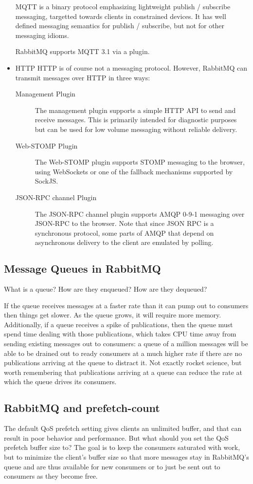 \begin{itemize}
  MQTT is a binary protocol emphasizing lightweight publish / subscribe messaging, targetted towards clients in constrained devices. It has well defined messaging semantics for publish / subscribe, but not for other messaging idioms.


  RabbitMQ supports MQTT 3.1 via a plugin.
  \item HTTP
  HTTP is of course not a messaging protocol. However, RabbitMQ can transmit messages over HTTP in three ways:

  \begin{description}
    \item[Management Plugin] The management plugin supports a simple HTTP API to send and receive messages. This is primarily intended for diagnostic purposes but can be used for low volume messaging without reliable delivery.
    \item [Web-STOMP Plugin] The Web-STOMP plugin supports STOMP messaging to the browser, using WebSockets or one of the fallback mechanisms supported by SockJS.
    \item [JSON-RPC channel Plugin] The JSON-RPC channel plugin supports AMQP 0-9-1 messaging over JSON-RPC to the browser. Note that since JSON RPC is a synchronous protocol, some parts of AMQP that depend on asynchronous delivery to the client are emulated by polling.
  \end{description}
\end{itemize}
  \subsection{Message Queues in RabbitMQ}
  What is a queue?
  How are they enqueued?
  How are they dequeued?

  If the queue receives messages at a faster rate than it can pump out to consumers then things get slower. As the queue grows, it will require more memory. Additionally, if a queue receives a spike of publications, then the queue must spend time dealing with those publications, which takes CPU time away from sending existing messages out to consumers: a queue of a million messages will be able to be drained out to ready consumers at a much higher rate if there are no publications arriving at the queue to distract it. Not exactly rocket science, but worth remembering that publications arriving at a queue can reduce the rate at which the queue drives its consumers.\cite{sizingYourRabbits}

  \subsection{RabbitMQ and prefetch-count}
  \label{sec:rabbitmq}
  The default QoS prefetch setting gives clients an unlimited buffer, and that can result in poor behavior and performance. But what should you set the QoS prefetch buffer size to? The goal is to keep the consumers saturated with work, but to minimize the client's buffer size so that more messages stay in RabbitMQ's queue and are thus available for new consumers or to just be sent out to consumers as they become free.

